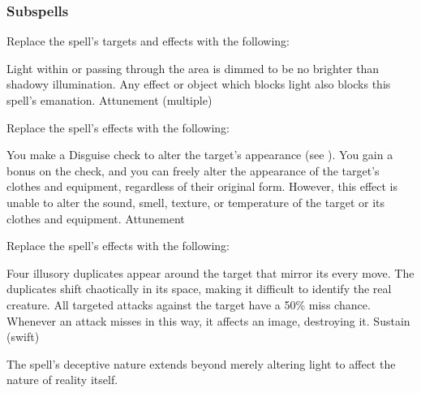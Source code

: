\subsubsection{Subspells}
Replace the spell's targets and effects with the following:
\begin{spellcontent}
\begin{augmenttargetinginfo}
\end{augmenttargetinginfo}
\begin{augmenteffects}
\spelleffect
Light within or passing through the area is dimmed to be no brighter than shadowy illumination.
Any effect or object which blocks light also blocks this spell's emanation.
\spelldur Attunement (multiple)
\end{augmenteffects}
\end{spellcontent}
Replace the spell's effects with the following:
\begin{spellcontent}
\begin{augmenteffects}
\spelleffect
You make a Disguise check to alter the target's appearance (see ).
You gain a  bonus on the check, and you can freely alter the appearance of the target's clothes and equipment, regardless of their original form.
However, this effect is unable to alter the sound, smell, texture, or temperature of the target or its clothes and equipment.
\spelldur Attunement
\end{augmenteffects}
\end{spellcontent}
Replace the spell's effects with the following:
\begin{spellcontent}
\begin{augmenteffects}
\spelleffect
Four illusory duplicates appear around the target that mirror its every move.
The duplicates shift chaotically in its space, making it difficult to identify the real creature.
All targeted attacks against the target have a 50\% miss chance.
Whenever an attack misses in this way, it affects an image, destroying it.
\spelldur Sustain (swift)
\end{augmenteffects}
\end{spellcontent}
The spell's deceptive nature extends beyond merely altering light to affect the nature of reality itself.

